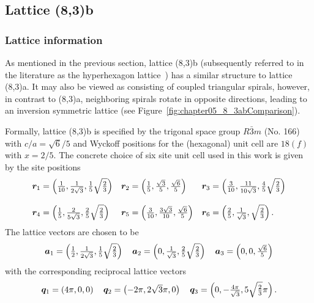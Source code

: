 %
%
\subsection{Lattice (8,3)b}
\label{section:chapter05_8_3b}
%
%
\subsubsection{Lattice information}
%
%
As mentioned in the previous section, lattice (8,3)b (subsequently referred to in the literature as the hyperhexagon lattice~\cite{SmithPRB2016,HalaszPRL2017,MasahikoPRL2018}) has a similar structure to lattice (8,3)a.
It may also be viewed as consisting of coupled triangular spirals, however, in contrast to (8,3)a, neighboring spirals rotate in opposite directions, leading to an inversion symmetric lattice (see Figure~\ref{fig:chapter05_8_3abComparison}).

Formally, lattice (8,3)b is specified by the trigonal space group $R\bar{3}m$ (No. 166) with $c/a = \sqrt{6}/5$ and Wyckoff positions for the (hexagonal) unit cell are $18(f)$ with $x=2/5$.
The concrete choice of six site unit cell used in this work is given by the site positions
%
\begin{equation}
	\begin{matrix*}[l]
		\br_1 = \left(\frac{1}{10}, \frac{1}{2\sqrt{3}}, \frac{1}{5}\sqrt{\frac{2}{3}}\right) &
		\br_2 = \left(\frac{1}{5}, \frac{\sqrt{3}}{5}, \frac{\sqrt{6}}{5}\right) &
		\br_3 = \left(\frac{3}{10}, \frac{11}{10\sqrt{3}}, \frac{4}{5}\sqrt{\frac{2}{3}}\right) \\
		&\\
		\br_4 = \left(\frac{1}{5}, \frac{2}{5\sqrt{3}}, \frac{2}{5}\sqrt{\frac{2}{3}}\right) &
		\br_5 = \left(\frac{3}{10}, \frac{3\sqrt{3}}{10}, \frac{\sqrt{6}}{5}\right) &
		\br_6 = \left(\frac{2}{5}, \frac{1}{\sqrt{3}}, \sqrt{\frac{2}{3}}\right).
	\end{matrix*}
\end{equation}
%
The lattice vectors are chosen to be
%
\begin{equation}
	\begin{matrix*}[l]
		\ba_1 = \left(\frac{1}{2}, \frac{1}{2\sqrt{3}}, \frac{1}{5}\sqrt{\frac{2}{3}}\right) \quad
		\ba_2 = \left(0, \frac{1}{\sqrt{3}}, \frac{2}{5}\sqrt{\frac{2}{3}}\right) \quad
		\ba_3 = \left(0, 0, \frac{\sqrt{6}}{5}\right)
	\end{matrix*}
\end{equation}
%
with the corresponding reciprocal lattice vectors
%
\begin{equation}
	\begin{matrix*}[l]
		\bq_1 = \left(4\pi, 0, 0\right) \quad
		\bq_2 = \left(-2\pi, 2\sqrt{3}\pi, 0\right) \quad
		\bq_3 = \left(0, -\frac{4\pi}{\sqrt{3}}, 5\sqrt{\frac{2}{3}}\pi\right).
	\end{matrix*}
\end{equation}
%


